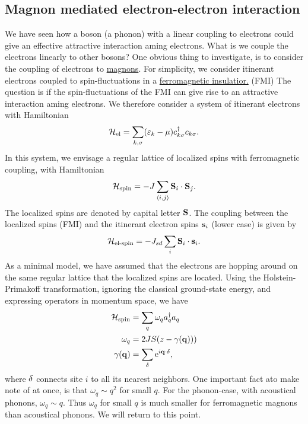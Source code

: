 \subsection[Magnons]{Magnon mediated electron-electron interaction}

We have seen how a boson (a phonon) with a linear coupling to electrons could give an effective attractive interaction aming electrons. 
What is we couple the electrons linearly to other bosons? One obvious thing to investigate, is to consider the coupling of electrons to \underline{magnons}.
For simplicity, we consider itinerant electrons coupled to spin-fluctuations in a \underline{ferromagnetic insulatior.} (FMI) The question is if the spin-fluctuations of the FMI can give rise to an attractive interaction aming electrons.
We therefore consider a system of itinerant electrons with Hamiltonian 
\begin{equation}
	\mathcal{H}_{\text{el}} = \sum_{k, \sigma}(\varepsilon_{k}-\mu)c_{k\sigma}^\dagger c_{k\sigma}.
\end{equation}
In this system, we envisage a regular lattice of localized spins with ferromagnetic coupling, with Hamiltonian
\begin{equation}
	\mathcal{H}_{\text{spin}} = -J\sum_{\langle i,j\rangle}\vb S_i\cdot\vb S_j.
	\end{equation}
The localized spins are denoted by capital letter $\vb S$.
The coupling between the localized spins (FMI) and the itinerant electron spins $\vb s_i$ (lower case) is given by 
\begin{equation}
	\mathcal{H}_{\text{el-spin}}  = -J_{sd}\sum_i\vb S_i\cdot \vb s_i.
\end{equation}
As a minimal model, we have assumed that the electrons are hopping around on the same regular lattice that the localized spins are located. 
Using the Holstein-Primakoff transformation, ignoring the classical ground-state energy, and expressing operators in momentum space, we have 
\begin{align}
	\mathcal{H}_{\text{spin}} &= \sum_q \omega_qa_q^\dagger a_q \\
	\omega_q &= 2JS(z- \gamma(\vb q))) \\
	\gamma(\vb q) &= \sum_\delta\mathrm{e}^{i\vb q\cdot \vb \delta},
\end{align}
where $\vb \delta$ connects site $i$ to all its nearest neighbors.
One important fact ato make note of at once, is that $\omega_q \sim q^2$ for small $q$. For the phonon-case, with acoustical phonons, $\omega_q \sim q$. Thus $\omega_q$ for small $q$ is much smaller for ferromagnetic magnons than acoustical phonons. We will return to this point. 
